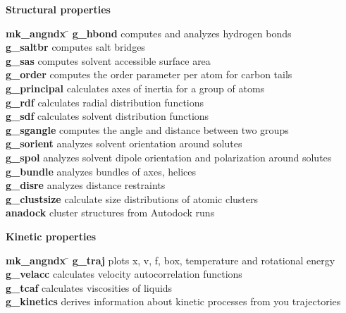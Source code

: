 \begin{description}
\item {\large\bf Structural properties}
\vspace{-2ex}\begin{tabbing}
{\bf mk\_angndx} \= \kill
{\bf g\_hbond} \> computes and analyzes hydrogen bonds \\
{\bf g\_saltbr} \> computes salt bridges \\
{\bf g\_sas} \> computes solvent accessible surface area \\
{\bf g\_order} \> computes the order parameter per atom for carbon tails \\
{\bf g\_principal} \> calculates axes of inertia for a group of atoms \\
{\bf g\_rdf} \> calculates radial distribution functions \\
{\bf g\_sdf} \> calculates solvent distribution functions \\
{\bf g\_sgangle} \> computes the angle and distance between two groups \\
{\bf g\_sorient} \> analyzes solvent orientation around solutes \\
{\bf g\_spol} \> analyzes solvent dipole orientation and polarization around solutes \\
{\bf g\_bundle} \> analyzes bundles of axes, {\eg} helices \\
{\bf g\_disre} \> analyzes distance restraints \\
{\bf g\_clustsize} \> calculate size distributions of atomic clusters \\
{\bf anadock} \> cluster structures from Autodock runs \\
\end{tabbing}\vspace{-2ex}

\item {\large\bf Kinetic properties}
\vspace{-2ex}\begin{tabbing}
{\bf mk\_angndx} \= \kill
{\bf g\_traj} \> plots x, v, f, box, temperature and rotational energy \\
{\bf g\_velacc} \> calculates velocity autocorrelation functions \\
{\bf g\_tcaf} \> calculates viscosities of liquids \\
{\bf g\_kinetics} \> derives information about kinetic processes from you trajectories \\
\end{tabbing}\vspace{-2ex}


\end{description}
